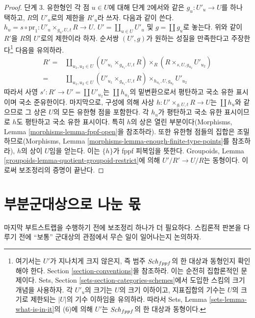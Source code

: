 \begin{proof}
\medskip\noindent
단계 3. 유한형인 각 점 $u \in U$에 대해 단계 2에서와 같은
$g_u : U'_u \to U$를 하나 택하고, $R$의 $U'_u$로의 제한을 $R'_u$라
쓰자. 다음과 같이 쓴다.
$h_u = s \circ \text{pr}_1 : U'_u \times_{g_u, U, t} R \to U$.
$U' = \coprod_{u \in U} U'_u$ 및 $g = \coprod g_u$로 놓는다. 위와 같이
$R'$을 $R$의 $U'$로의 제한이라 하자. 순서쌍 $(U', g)$가 원하는
성질을 만족한다고 주장한다\footnote{여기서는 $U'$가 지나치게 크지
않은지, 즉 범주 $\mathit{Sch}_{fppf}$의 한 대상과 동형인지 확인해야 한다.
Section \ref{section-conventions}을 참조하라. 이는 순전히 집합론적인
문제이다. Sets, Section \ref{sets-section-categories-schemes}에서 도입한
스킴의 크기 개념을 사용하자. 각 $U'_u$의 크기는 $U$의 크기 이하이고,
지표집합의 기수는 $U$의 크기로 제한되는 $|U|$의 기수 이하임을
유의하라. 따라서 Sets, Lemma \ref{sets-lemma-what-is-in-it}의 (6)에
의해 $U'$는 $\mathit{Sch}_{fppf}$의 한 대상과 동형이다.} 다음을 유의하라.
\begin{align*}
R' = &
\coprod\nolimits_{u_1, u_2 \in U}
(U'_{u_1} \times_{g_{u_1}, U, t} R)
\times_R
(R \times_{s, U, g_{u_2}} U'_{u_2}) \\
= &
\coprod\nolimits_{u_1, u_2 \in U}
(U'_{u_1} \times_{g_{u_1}, U, t} R) \times_{h_{u_1}, U, g_{u_2}} U'_{u_2}
\end{align*}
따라서 사영 $s' : R' \to U' = \coprod U'_{u_2}$는
$\coprod h_{u_1}$의 밑변환으로서 평탄하고 국소 유한 표시이며 국소
준유한이다. 마지막으로, 구성에 의해 사상
$h : U' \times_{g, U, t} R \to U$는 $\coprod h_u$와 같으므로 그 상은
$U$의 모든 유한형 점을 포함한다. 각 $h_u$가 평탄하고 국소 유한
표시이므로 $h$도 평탄하고 국소 유한 표시이다. 특히 $h$의 상은 열린
부분이다(Morphisms, Lemma \ref{morphisms-lemma-fppf-open}을 참조하라).
또한 유한형 점들의 집합은 조밀하므로(Morphisms, Lemma
\ref{morphisms-lemma-enough-finite-type-points}를 참조하라), $h$의 상이
$U$임을 얻는다. 이는 $\{h\}$가 fppf 피복임을 뜻한다. Groupoids, Lemma
\ref{groupoids-lemma-quotient-groupoid-restrict}에 의해
$U'/R' \to U/R$는 동형이다. 이로써 보조정리의 증명이 끝난다.
\end{proof}


\section{부분군대상으로 나눈 몫}
\label{section-dividing}

\noindent
마지막 부트스트랩을 수행하기 전에 보조정리 하나가 더 필요하다.
스킴론적 판본을 다루기 전에 ``보통'' 군대상의 관점에서 무슨 일이
일어나는지 논의하자.

